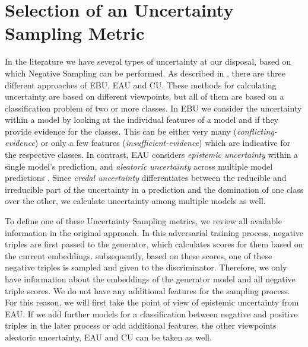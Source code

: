 \section{Selection of an Uncertainty Sampling Metric} 
\label{sec:selection_of_an_uncertainty_sampling_metric}

In the literature we have several types of uncertainty at our disposal, based on which Negative Sampling can be performed.
As described in , there are three different approaches of \ac{EBU}, \ac{EAU} and \ac{CU}.
These methods for calculating uncertainty are based on different viewpoints, but all of them are based on a classification problem of two or more classes.
In \ac{EBU} we consider the uncertainty within a model by looking at the individual features of a model and if they provide evidence for the classes.
This can be either very many (\textit{conflicting-evidence}) or only a few features (\textit{insufficient-evidence}) which are indicative for the respective classes.
In contrast, \ac{EAU} considers \textit{epistemic uncertainty} within a single model’s prediction, and \textit{aleatoric uncertainty} across multiple model predictions \cite{human-in-the-loop}.
Since \textit{credal uncertainty} differentiates between the reducible and irreducible part of the uncertainty in a prediction and the domination of one class over the other, we calculate uncertainty among multiple models as well.

To define one of these Uncertainty Sampling metrics, we review all available information in the original approach.
In this adversarial training process, negative triples are first passed to the generator, which calculates scores for them based on the current embeddings.
subsequently, based on these scores, one of these negative triples is sampled and given to the discriminator.
Therefore, we only have information about the embeddings of the generator model and all negative triple scores.
We do not have any additional features for the sampling process.
For this reason, we will first take the point of view of epistemic uncertainty from \ac{EAU}.
If we add further models for a classification between negative and positive triples in the later process or add additional features, the other viewpoints aleatoric uncertainty, \ac{EAU} and \ac{CU} can be taken as well.


